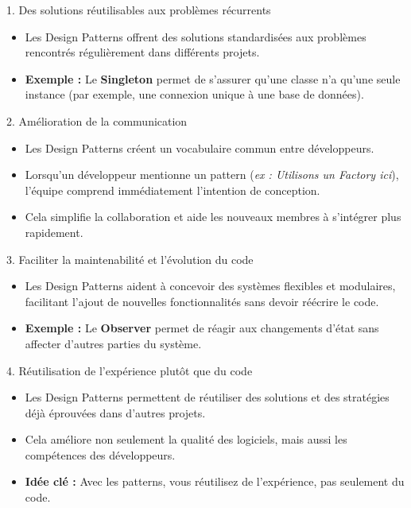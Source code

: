 \documentclass[aspectratio=169]{beamer}
\begin{document}
        \begin{frame}{1. Des solutions réutilisables aux problèmes récurrents}
            \begin{itemize}
                \item Les Design Patterns offrent des solutions standardisées aux problèmes rencontrés régulièrement dans différents projets.
                \item \textbf{Exemple :} Le \textbf{Singleton} permet de s'assurer qu'une classe n'a qu'une seule instance (par exemple, une connexion unique à une base de données).
            \end{itemize}
        \end{frame}

        \begin{frame}{2. Amélioration de la communication}
            \begin{itemize}
                \item Les Design Patterns créent un vocabulaire commun entre développeurs.
                \item Lorsqu'un développeur mentionne un pattern (\textit{ex : Utilisons un Factory ici}), l'équipe comprend immédiatement l'intention de conception.
                \item Cela simplifie la collaboration et aide les nouveaux membres à s'intégrer plus rapidement.
            \end{itemize}
        \end{frame}

        \begin{frame}{3. Faciliter la maintenabilité et l’évolution du code}
            \begin{itemize}
                \item Les Design Patterns aident à concevoir des systèmes flexibles et modulaires, facilitant l’ajout de nouvelles fonctionnalités sans devoir réécrire le code.
                \item \textbf{Exemple :} Le \textbf{Observer} permet de réagir aux changements d'état sans affecter d'autres parties du système.
            \end{itemize}
        \end{frame}

        \begin{frame}{4. Réutilisation de l’expérience plutôt que du code}
            \begin{itemize}
                \item Les Design Patterns permettent de réutiliser des solutions et des stratégies déjà éprouvées dans d'autres projets.
                \item Cela améliore non seulement la qualité des logiciels, mais aussi les compétences des développeurs.
                \item \textbf{Idée clé :} Avec les patterns, vous réutilisez de l’expérience, pas seulement du code.
            \end{itemize}
        \end{frame}
\end{document}
